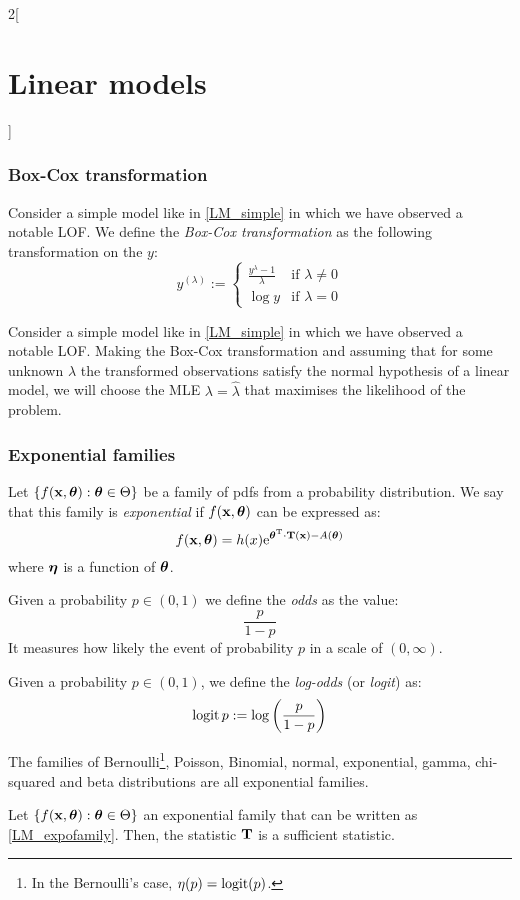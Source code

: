 \documentclass[../../../main_math.tex]{subfiles}
\begin{document}
\begin{multicols}{2}[\section{Linear models}]
  \subsubsection{Box-Cox transformation}
  \begin{definition}
    Consider a simple model like in \cref{LM_simple} in which we have observed a notable LOF. We define the \emph{Box-Cox transformation} as the following transformation on the $y$:
    $$
      y^{(\lambda)}:=\begin{cases}
        \displaystyle\frac{y^\lambda-1}{\lambda} & \text{if $\lambda\ne 0$} \\
        \log y                                   & \text{if $\lambda= 0$}
      \end{cases}
    $$
  \end{definition}
  \begin{proposition}
    Consider a simple model like in \cref{LM_simple} in which we have observed a notable LOF. Making the Box-Cox transformation and assuming that for some unknown $\lambda$ the transformed observations satisfy the normal hypothesis of a linear model, we will choose the MLE $\lambda=\hat\lambda$ that maximises the likelihood of the problem.
  \end{proposition}
  \subsubsection{Exponential families}
  \begin{definition}
    Let $\{f(\boldsymbol{\mathrm{x}},\boldsymbol{\mathrm{\theta}}):\boldsymbol{\mathrm{\theta}}\in\Theta\}$ be a family of pdfs from a probability distribution. We say that this family is \emph{exponential} if $f(\boldsymbol{\mathrm{x}},\boldsymbol{\mathrm{\theta}})$ can be expressed as:
    \begin{equation}\label{LM_expofamily}
      f(\boldsymbol{\mathrm{x}},\boldsymbol{\mathrm{\theta}})=h(x)\mathrm{e}^{{\boldsymbol{\mathrm{\theta}}}^{\mathrm{T}}\cdot \boldsymbol{\mathrm{T}}(\boldsymbol{\mathrm{x}})-A(\boldsymbol{\mathrm{\theta}})}
    \end{equation}
    where $\boldsymbol{\mathrm{\eta}}$ is a function of $\boldsymbol{\mathrm{\theta}}$.
  \end{definition}
  \begin{definition}
    Given a probability $p\in(0,1)$ we define the \emph{odds} as the value: $$\frac{p}{1-p}$$ It measures how likely the event of probability $p$ in a scale of $(0,\infty)$.
  \end{definition}
  \begin{definition}
    Given a probability $p\in(0,1)$, we define the \emph{log-odds} (or \emph{logit}) as: $$\operatorname{logit} p:=\log\left(\frac{p}{1-p}\right)$$
  \end{definition}
  \begin{proposition}
    The families of Bernoulli\footnote{In the Bernoulli's case, $\eta(p)=\operatorname{logit}(p)$.}, Poisson, Binomial, normal, exponential, gamma, chi-squared and beta distributions are all exponential families.
  \end{proposition}
  \begin{theorem}
    Let $\{f(\boldsymbol{\mathrm{x}},\boldsymbol{\mathrm{\theta}}):\boldsymbol{\mathrm{\theta}}\in\Theta\}$  an exponential family that can be written as \cref{LM_expofamily}. Then, the statistic $\boldsymbol{\mathrm{T}}$ is a sufficient statistic.
  \end{theorem}
\end{multicols}
\end{document}
